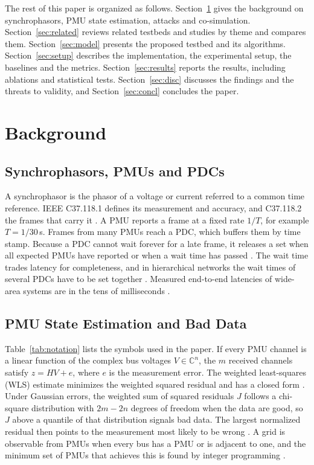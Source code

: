 \documentclass[journal]{IEEEtran}
\begin{document}
The rest of this paper is organized as follows. Section~\ref{sec:background} gives the background on synchrophasors, PMU state estimation, attacks and co-simulation. Section~\ref{sec:related} reviews related testbeds and studies by theme and compares them. Section~\ref{sec:model} presents the proposed testbed and its algorithms. Section~\ref{sec:setup} describes the implementation, the experimental setup, the baselines and the metrics. Section~\ref{sec:results} reports the results, including ablations and statistical tests. Section~\ref{sec:disc} discusses the findings and the threats to validity, and Section~\ref{sec:concl} concludes the paper.

\section{Background}
\label{sec:background}

\subsection{Synchrophasors, PMUs and PDCs}

A synchrophasor is the phasor of a voltage or current referred to a common time reference. IEEE C37.118.1 defines its measurement and accuracy, and C37.118.2 the frames that carry it \cite{c37118_1,c37118_2}. A PMU reports a frame at a fixed rate $1/T$, for example $T = 1/30$\,s. Frames from many PMUs reach a PDC, which buffers them by time stamp. Because a PDC cannot wait forever for a late frame, it releases a set when all expected PMUs have reported or when a wait time has passed \cite{c37244}. The wait time trades latency for completeness, and in hierarchical networks the wait times of several PDCs have to be set together \cite{pourramezan2021pdc}. Measured end-to-end latencies of wide-area systems are in the tens of milliseconds \cite{castello2024wampac,morato2024fiveg}.



\subsection{PMU State Estimation and Bad Data}

Table~\ref{tab:notation} lists the symbols used in the paper. If every PMU channel is a linear function of the complex bus voltages $V \in \mathbb{C}^n$, the $m$ received channels satisfy $z = HV + e$, where $e$ is the measurement error. The weighted least-squares (WLS) estimate minimizes the weighted squared residual and has a closed form \cite{abur2004se}. Under Gaussian errors, the weighted sum of squared residuals $J$ follows a chi-square distribution with $2m - 2n$ degrees of freedom when the data are good, so $J$ above a quantile of that distribution signals bad data. The largest normalized residual then points to the measurement most likely to be wrong \cite{handschin1975,abur2004se}. A grid is observable from PMUs when every bus has a PMU or is adjacent to one, and the minimum set of PMUs that achieves this is found by integer programming \cite{baldwin1993,gou2008}.
\end{document}
